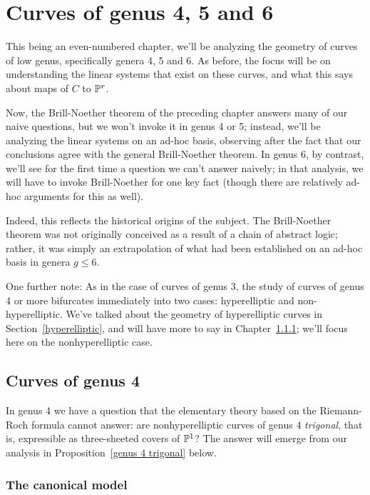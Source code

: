 

\chapter{Curves of genus 4, 5 and 6}\label{genus 4, 5 and 6 chapter}

This being an even-numbered chapter, we'll be analyzing the geometry of curves of low genus, specifically genera 4, 5 and 6. As before, the focus will be on understanding the linear systems that exist on these curves, and what this says about maps of $C$ to ${\mathbb P}^r$. 

Now, the Brill-Noether theorem of the preceding chapter answers many of our naive questions, but we won't invoke it in genus 4 or 5; instead, we'll be analyzing the linear systems on an ad-hoc basis, observing after the fact that our conclusions agree with the general Brill-Noether theorem. In genus 6, by contrast, we'll see for the first time a question we can't answer naively; in that analysis, we will have to invoke Brill-Noether for one key fact (though there are relatively ad-hoc arguments for this as well).

Indeed, this reflects the historical origins of the subject. The Brill-Noether theorem was not originally conceived as a result of a chain of abstract logic; rather, it was simply an extrapolation of what had been established on an ad-hoc basis in genera $g \leq 6$.

One further note: As in the case of curves of genus 3, the study of curves of genus 4 or more bifurcates immediately into two cases: hyperelliptic and non-hyperelliptic. We've talked about the geometry of hyperelliptic curves in Section~\ref{hyperelliptic}, and will have more to say in Chapter~\ref{}; we'll focus here on the nonhyperelliptic case.


\section{Curves of genus 4}


In genus 4 we have a question that the elementary theory based on the Riemann-Roch formula cannot answer: are nonhyperelliptic curves of genus 4 \emph{trigonal}, that is, expressible as three-sheeted covers of ${\mathbb P}^1$? The answer will emerge from our analysis in Proposition~\ref{genus 4 trigonal} below.

\subsection{The canonical model}


